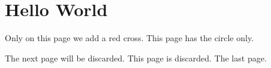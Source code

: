 \documentclass[a4paper]{tarticle}
\begin{document}
\section{Hello World}
\newpage
{}
Only on this page we add a red cross.
\newpage
This page has the circle only.
\par
\vspace{\fill}
The next page will be discarded.
\newpage
\AtBeginShipoutNext{%
  \AtBeginShipoutDiscard
}
This page is discarded.
\newpage
The last page.
\end{document}
